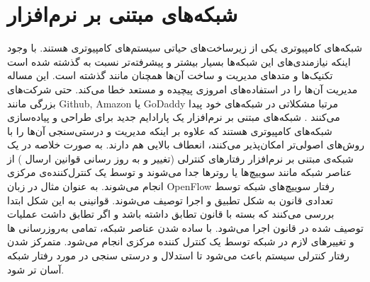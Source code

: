 \section{شبکه‌های مبتنی بر نرم‌افزار}
شبکه‌های کامپیوتری یکی از زیر‌ساخت‌های حیاتی سیستم‌های کامپیوتری هستند.
با وجود اینکه نیازمندی‌های این شبکه‌ها بسیار بیشتر و پیشرفته‌تر نسبت به گذشته شده است تکنیک‌ها و متد‌های مدیریت و ساخت آن‌ها همچنان مانند گذشته است. 
این مساله مدیریت آن‌ها را در استفاده‌های امروزی پیچیده و مستعد خطا می‌کند. 
حتی شرکت‌های بزرگی مانند
Github, Amazon
یا
GoDaddy
مرتبا مشکلاتی در شبکه‌های خود پیدا می‌کنند
\cite{foerster2018survey}
.
شبکه‌های مبتنی بر نرم‌افزار
یک پارادایم جدید برای طراحی و پیاده‌سازی شبکه‌های کامپیوتری هستند که علاوه بر اینکه مدیریت و درستی‌سنجی آن‌ها را با روش‌های اصولی‌تر امکان‌پذیر می‌کنند، انعطاف بالایی هم دارند.
به صورت خلاصه در یک شبکه‌ی مبتنی بر نرم‌افزار رفتار‌های کنترلی 
(تغییر و به روز رسانی قوانین ارسال
)
از عناصر شبکه مانند سوییچ‌ها یا روترها جدا می‌شوند و توسط یک کنترل‌کننده‌ی مرکزی انجام می‌شوند.
به عنوان مثال در زبان 
OpenFlow \cite{mckeown2008openflow}
رفتار سوییچ‌های شبکه توسط تعدادی قانون به شکل 
تطبیق و اجرا توصیف می‌شوند.
قوانینی به این شکل ابتدا بررسی می‌کنند که بسته با قانون تطابق داشته باشد و اگر تطابق داشت عملیات توصیف شده در قانون اجرا می‌شود.
با ساده شدن عناصر شبکه،‌ تمامی به‌روزرسانی ها و تغییر‌های لازم در شبکه توسط یک کنترل کننده مرکزی انجام می‌شود.
متمرکز شدن رفتار کنترلی سیستم باعث می‌شود تا استدلال و درستی سنجی در مورد رفتار شبکه آسان تر شود.